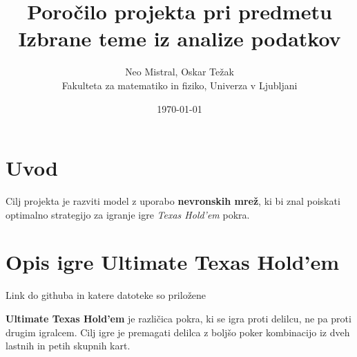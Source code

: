 \documentclass[a4paper,12pt]{article}
\title{Poročilo projekta pri predmetu Izbrane teme iz analize podatkov}
\author{Neo Mistral, Oskar Težak \\ Fakulteta za matematiko in fiziko, Univerza v Ljubljani}
\date{\today}
\begin{document}
\maketitle

\section{Uvod}

Cilj projekta je razviti model z uporabo \textbf{nevronskih mrež}, 
ki bi znal poiskati optimalno strategijo za igranje igre \textit{Texas Hold'em} pokra.
\section{Opis igre Ultimate Texas Hold'em} 

Link do githuba in katere datoteke so priložene

\textbf{Ultimate Texas Hold'em} je različica pokra, ki se igra proti delilcu, 
ne pa proti drugim igralcem. Cilj igre je premagati delilca z boljšo 
poker kombinacijo iz dveh lastnih in petih skupnih kart.
\end{document}
